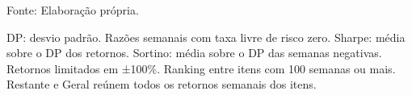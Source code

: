 \begin{table}[H]
{\begin{tabular}{lrrrrrrrrr}
\bottomrule
\end{tabular}
}
\par\vspace{\belowcaptionskip}\footnotesize Fonte: Elaboração própria.\par
\begin{minipage}{\linewidth}
DP: desvio padrão. Razões semanais com taxa livre de risco zero. Sharpe: média sobre o DP dos retornos. Sortino: média sobre o DP das semanas negativas. Retornos limitados em ±100\%. Ranking entre itens com 100 semanas ou mais. Restante e Geral reúnem todos os retornos semanais dos itens.\\
\end{minipage}
\end{table}
